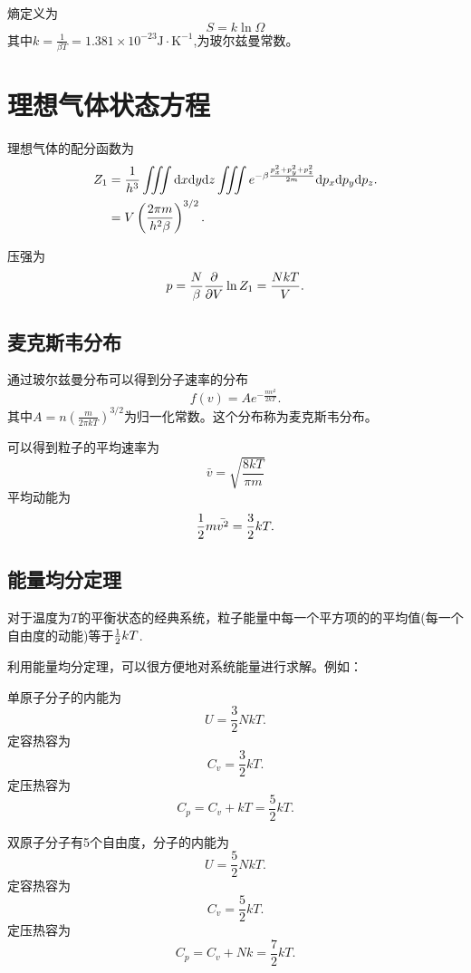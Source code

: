 熵定义为
\begin{equation}
    S=k\ln\Omega
\end{equation}
其中$k=\frac{1}{\beta T}=1.381\times 10^{-23}\mathrm{J\cdot K^{-1}}$,为玻尔兹曼常数。

\section{理想气体状态方程}
理想气体的配分函数为
\begin{equation}
    \begin{aligned}
        Z_1& =\frac{1}{h^3}\iiint\mathrm{d} x\mathrm{d} y\mathrm{d} z \iiint e^{-\beta\frac{p_x^2+p_y^2+p_z^2}{2m}}\mathrm{d} p_x \mathrm{d} p_y \mathrm{d} p_z.\\
        &=V\left(\frac{2\pi m}{h^2\beta}\right)^{3/2}.
    \end{aligned}
\end{equation}

压强为
\begin{equation}
    p=\frac{N}{\beta}\frac{\partial }{\partial V}\ln Z_1=\frac{NkT}{V}.
\end{equation}

\subsection{麦克斯韦分布}
通过玻尔兹曼分布可以得到分子速率的分布
\begin{equation}
    f(v)=A e^{-\frac{mv^2}{2kT}}.
\end{equation}
其中$A=n\left(\frac{m}{2\pi kT}\right)^{3/2}$为归一化常数。这个分布称为麦克斯韦分布。

可以得到粒子的平均速率为\[\bar{v}=\sqrt{\frac{8kT}{\pi m}}\]
平均动能为\[\frac{1}{2} m\bar{v^2}=\frac{3}{2}kT.\]

\subsection{能量均分定理}
\begin{theorem}[能量均分定理]
    对于温度为$T$的平衡状态的经典系统，粒子能量中每一个平方项的的平均值(每一个自由度的动能)等于$\frac{1}{2} kT$.
\end{theorem}

利用能量均分定理，可以很方便地对系统能量进行求解。例如：
\par 
单原子分子的内能为\[U=\frac{3}{2}NkT.\]
定容热容为\[C_v=\frac{3}{2}kT.\]
定压热容为\[C_p=C_v+kT=\frac{5}{2}kT.\]

双原子分子有5个自由度，分子的内能为\[U=\frac{5}{2}NkT.\]
定容热容为\[C_v=\frac{5}{2}kT.\]
定压热容为\[C_p=C_v+Nk=\frac{7}{2}kT.\]

